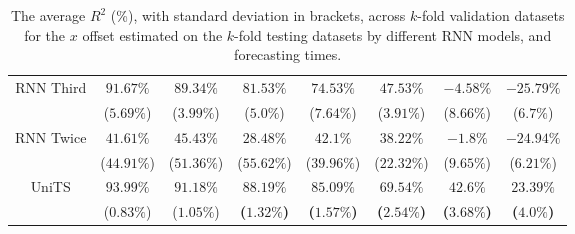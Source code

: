\begin{table}[!ht]
{\begin{tabular}{|c|c|c|c|c|c|c|c|}
			\multirow{2}{*}{RNN Third} & $91.67\%$ & $89.34\%$ & $81.53\%$ & $74.53\%$ & $47.53\%$ & $-4.58\%$ & $-25.79\%$ \\
			 & ($5.69\%$) & ($3.99\%$) & ($5.0\%$) & ($7.64\%$) & ($3.91\%$) & ($8.66\%$) & ($6.7\%$) \\ \hline
			\multirow{2}{*}{RNN Twice} & $41.61\%$ & $45.43\%$ & $28.48\%$ & $42.1\%$ & $38.22\%$ & $-1.8\%$ & $-24.94\%$ \\
			 & ($44.91\%$) & ($51.36\%$) & ($55.62\%$) & ($39.96\%$) & ($22.32\%$) & ($9.65\%$) & ($6.21\%$) \\ \hline
			\multirow{2}{*}{UniTS} & $93.99\%$ & $91.18\%$ & $\mathbf{88.19\%}$ & $\mathbf{85.09\%}$ & $\mathbf{69.54\%}$ & $\mathbf{42.6\%}$ & $\mathbf{23.39\%}$ \\
			 & ($0.83\%$) & ($1.05\%$) & \textbf{(}$\mathbf{1.32\%}$\textbf{)} & \textbf{(}$\mathbf{1.57\%}$\textbf{)} & \textbf{(}$\mathbf{2.54\%}$\textbf{)} & \textbf{(}$\mathbf{3.68\%}$\textbf{)} & \textbf{(}$\mathbf{4.0\%}$\textbf{)} \\ \hline
		\end{tabular}
	}
	\caption{The average $R^{2}$ (\%), with standard deviation in brackets, across $k$-fold validation datasets for the $x$ offset estimated on the $k$-fold testing datasets by different RNN models, and forecasting times.}
	\label{tab:all_longitude_no_abs_R2}
\end{table}

